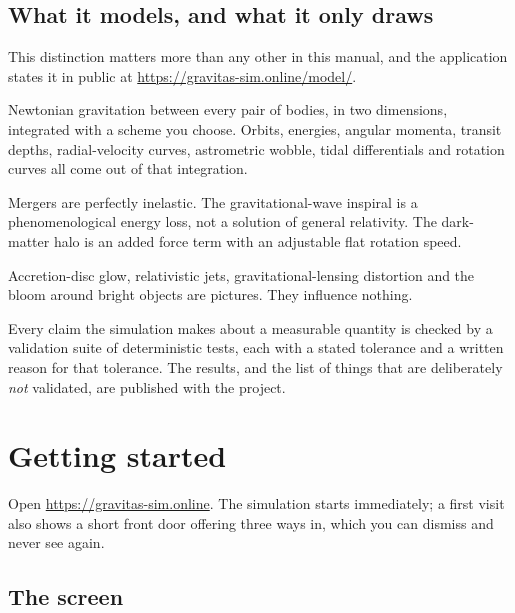 \documentclass[11pt,a4paper]{article}
\begin{document}
\subsection{What it models, and what it only draws}

This distinction matters more than any other in this manual, and the application
states it in public at \url{https://gravitas-sim.online/model/}.

\begin{description}[style=nextline,leftmargin=1em]
  \item[Calculated] Newtonian gravitation between every pair of bodies, in two
  dimensions, integrated with a scheme you choose. Orbits, energies, angular
  momenta, transit depths, radial-velocity curves, astrometric wobble, tidal
  differentials and rotation curves all come out of that integration.
  \item[Approximated] Mergers are perfectly inelastic. The gravitational-wave
  inspiral is a phenomenological energy loss, not a solution of general
  relativity. The dark-matter halo is an added force term with an adjustable
  flat rotation speed.
  \item[Drawn only] Accretion-disc glow, relativistic jets, gravitational-lensing
  distortion and the bloom around bright objects are pictures. They influence
  nothing.
\end{description}

Every claim the simulation makes about a measurable quantity is checked by a
validation suite of \GravPhysicsChecks{} deterministic tests, each with a stated
tolerance and a written reason for that tolerance. The results, and the list of
things that are deliberately \emph{not} validated, are published with the
project.

\section{Getting started}

Open \url{https://gravitas-sim.online}. The simulation starts immediately; a
first visit also shows a short front door offering three ways in, which you can
dismiss and never see again.

\subsection{The screen}
\end{document}
